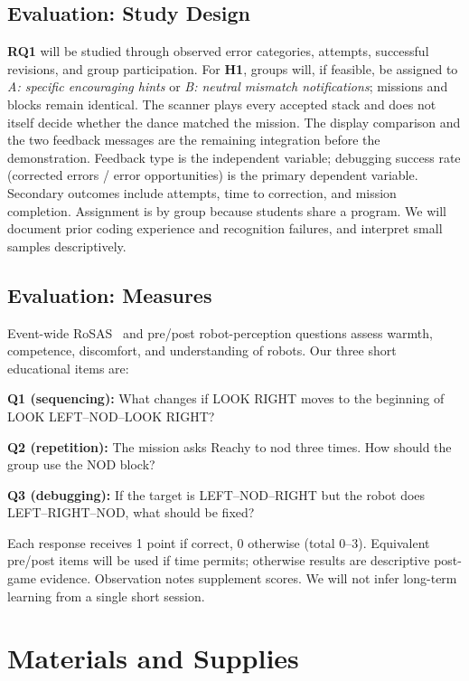 \documentclass[conference,12pt,letterpaper]{IEEEtran}
\begin{document}
\subsection{Evaluation: Study Design}

\textbf{RQ1} will be studied through observed error categories, attempts, successful revisions, and group participation. For \textbf{H1}, groups will, if feasible, be assigned to \emph{A: specific encouraging hints} or \emph{B: neutral mismatch notifications}; missions and blocks remain identical. The scanner plays every accepted stack and does not itself decide whether the dance matched the mission. The display comparison and the two feedback messages are the remaining integration before the demonstration. Feedback type is the independent variable; debugging success rate (corrected errors / error opportunities) is the primary dependent variable. Secondary outcomes include attempts, time to correction, and mission completion. Assignment is by group because students share a program. We will document prior coding experience and recognition failures, and interpret small samples descriptively.

\subsection{Evaluation: Measures}

Event-wide RoSAS~\cite{carpinella2017} and pre/post robot-perception questions assess warmth, competence, discomfort, and understanding of robots. Our three short educational items are:

\textbf{Q1 (sequencing):} What changes if LOOK RIGHT moves to the beginning of LOOK LEFT--NOD--LOOK RIGHT?

\textbf{Q2 (repetition):} The mission asks Reachy to nod three times. How should the group use the NOD block?

\textbf{Q3 (debugging):} If the target is LEFT--NOD--RIGHT but the robot does LEFT--RIGHT--NOD, what should be fixed?

Each response receives 1 point if correct, 0 otherwise (total 0--3). Equivalent pre/post items will be used if time permits; otherwise results are descriptive post-game evidence. Observation notes supplement scores. We will not infer long-term learning from a single short session.

\section{Materials and Supplies}
\end{document}
